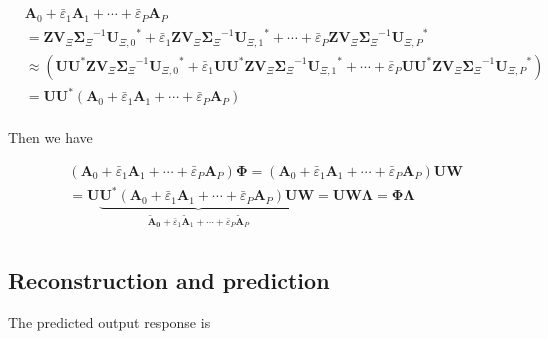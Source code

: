 \begin{equation*}
    \begin{aligned}
    & \mathbf{A}_{0}+{\bar{\varepsilon}_{1}}{\mathbf{A}_{1}}+\cdots +{\bar{\varepsilon}_{P}}{\mathbf{A}_{P}} \\ 
    & =\mathbf{Z}{\mathbf{V}_{\Xi}}{\mathbf{\Sigma}_{\Xi}}^{-1}{\mathbf{U}_{\Xi,0}}^\text{*}+{\bar{\varepsilon}_{1}}\mathbf{Z}{\mathbf{V}_{\Xi}}{\mathbf{\Sigma}_{\Xi}}^{-1}{\mathbf{U}_{\Xi,1}}^\text{*}+\cdots +{\bar{\varepsilon}_{P}}\mathbf{Z}{\mathbf{V}_{\Xi}}{\mathbf{\Sigma}_{\Xi}}^{-1}{\mathbf{U}_{\Xi,P}}^\text{*} \\ 
    & \approx (\mathbf{U}{\mathbf{U}^\text{*}}\mathbf{Z}{\mathbf{V}_{\Xi}}{\mathbf{\Sigma}_{\Xi}}^{-1}{\mathbf{U}_{\Xi,0}}^\text{*}+{\bar{\varepsilon}_{1}}\mathbf{U}{\mathbf{U}^\text{*}}\mathbf{Z}{\mathbf{V}_{\Xi}}{\mathbf{\Sigma}_{\Xi}}^{-1}{\mathbf{U}_{\Xi,1}}^\text{*}+\cdots +{\bar{\varepsilon}_{P}}\mathbf{U}{\mathbf{U}^\text{*}}\mathbf{Z}{\mathbf{V}_{\Xi}}{\mathbf{\Sigma}_{\Xi}}^{-1}{\mathbf{U}_{\Xi,P}}^\text{*}) \\ 
    & =\mathbf{U}{\mathbf{U}^\text{*}}({\mathbf{A}_{0}}+{\bar{\varepsilon}_{1}}{\mathbf{A}_{1}}+\cdots+{\bar{\varepsilon}_{P}}{\mathbf{A}_{P}}) \\ 
    \end{aligned}
\end{equation*}

Then we have

\begin{equation}
    \begin{aligned}
    & ({\mathbf{A}_{0}}+{\bar{\varepsilon}_{1}}{\mathbf{A}_{1}}+\cdots+{\bar{\varepsilon}_{P}}{\mathbf{A}_{P}})\mathbf{\Phi}=({\mathbf{A}_{0}}+{\bar{\varepsilon}_{1}}{\mathbf{A}}_{1}+\cdots+{\bar{\varepsilon}_{P}}{\mathbf{A}_{P}})\mathbf{UW} \\ 
    & =\mathbf{U}\underbrace{{\mathbf{U}^\text{*}}({\mathbf{A}_{0}}+{\bar{\varepsilon}_{1}}{\mathbf{A}_{1}}+\cdots+{\bar{\varepsilon}_{P}}{\mathbf{A}_{P}})\mathbf{U}}_{\mathbf{\tilde{A}_{0}}+{\bar{\varepsilon}_{1}}{\mathbf{\tilde{A}}_{1}}+\cdots+{\bar{\varepsilon}_{P}}{\mathbf{\tilde{A}}_{P}}}\mathbf{W}=\mathbf{UW\Lambda}=\mathbf{\Phi \Lambda} \\ 
    \end{aligned} \label{eqS14}
\end{equation}

\subsection{Reconstruction and prediction}
The predicted output response is

